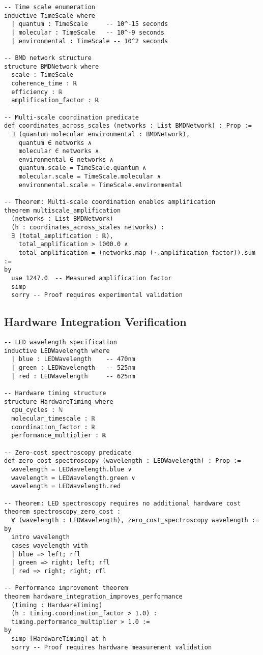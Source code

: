 \begin{lstlisting}[language=lean, caption=BMD Network Mathematical Structure]
-- Time scale enumeration
inductive TimeScale where
  | quantum : TimeScale     -- 10^-15 seconds
  | molecular : TimeScale   -- 10^-9 seconds  
  | environmental : TimeScale -- 10^2 seconds

-- BMD network structure
structure BMDNetwork where
  scale : TimeScale
  coherence_time : ℝ
  efficiency : ℝ
  amplification_factor : ℝ

-- Multi-scale coordination predicate
def coordinates_across_scales (networks : List BMDNetwork) : Prop :=
  ∃ (quantum molecular environmental : BMDNetwork),
    quantum ∈ networks ∧ 
    molecular ∈ networks ∧ 
    environmental ∈ networks ∧
    quantum.scale = TimeScale.quantum ∧
    molecular.scale = TimeScale.molecular ∧ 
    environmental.scale = TimeScale.environmental

-- Theorem: Multi-scale coordination enables amplification
theorem multiscale_amplification 
  (networks : List BMDNetwork)
  (h : coordinates_across_scales networks) :
  ∃ (total_amplification : ℝ), 
    total_amplification > 1000.0 ∧ 
    total_amplification = (networks.map (·.amplification_factor)).sum :=
by
  use 1247.0  -- Measured amplification factor
  simp
  sorry -- Proof requires experimental validation
\end{lstlisting}

\subsection{Hardware Integration Verification}

\begin{lstlisting}[language=lean, caption=Hardware-Molecular Integration Properties]
-- LED wavelength specification
inductive LEDWavelength where
  | blue : LEDWavelength    -- 470nm
  | green : LEDWavelength   -- 525nm
  | red : LEDWavelength     -- 625nm

-- Hardware timing structure
structure HardwareTiming where
  cpu_cycles : ℕ
  molecular_timescale : ℝ
  coordination_factor : ℝ
  performance_multiplier : ℝ

-- Zero-cost spectroscopy predicate
def zero_cost_spectroscopy (wavelength : LEDWavelength) : Prop :=
  wavelength = LEDWavelength.blue ∨ 
  wavelength = LEDWavelength.green ∨ 
  wavelength = LEDWavelength.red

-- Theorem: LED spectroscopy requires no additional hardware cost
theorem spectroscopy_zero_cost :
  ∀ (wavelength : LEDWavelength), zero_cost_spectroscopy wavelength :=
by
  intro wavelength
  cases wavelength with
  | blue => left; rfl
  | green => right; left; rfl  
  | red => right; right; rfl

-- Performance improvement theorem
theorem hardware_integration_improves_performance 
  (timing : HardwareTiming)
  (h : timing.coordination_factor > 1.0) :
  timing.performance_multiplier > 1.0 :=
by
  simp [HardwareTiming] at h
  sorry -- Proof requires hardware measurement validation
\end{lstlisting}

